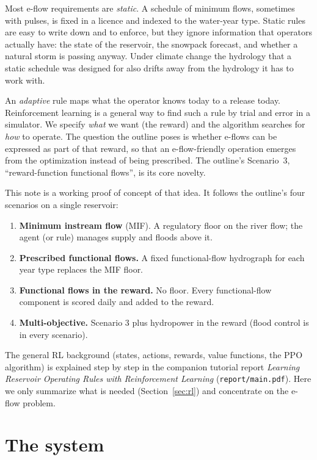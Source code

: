 \documentclass[11pt]{article}
\newcommand{\code}[1]{\texttt{#1}}
\begin{document}
Most e-flow requirements are \emph{static}. A schedule of minimum flows,
sometimes with pulses, is fixed in a licence and indexed to the water-year
type. Static rules are easy to write down and to enforce, but they ignore
information that operators actually have: the state of the reservoir, the
snowpack forecast, and whether a natural storm is passing anyway. Under
climate change the hydrology that a static schedule was designed for also
drifts away from the hydrology it has to work with.

An \emph{adaptive} rule maps what the operator knows today to a release
today. Reinforcement learning is a general way to find such a rule by
trial and error in a simulator. We specify \emph{what} we want (the reward)
and the algorithm searches for \emph{how} to operate. The question the
outline poses is whether e-flows can be expressed as part of that reward,
so that an e-flow-friendly operation emerges from the optimization instead
of being prescribed. The outline's Scenario~3, ``reward-function
functional flows'', is its core novelty.

This note is a working proof of concept of that idea. It follows the
outline's four scenarios on a single reservoir:

\begin{enumerate}
\item \textbf{Minimum instream flow} (MIF). A regulatory floor on the river
  flow; the agent (or rule) manages supply and floods above it.
\item \textbf{Prescribed functional flows.} A fixed functional-flow
  hydrograph for each year type replaces the MIF floor.
\item \textbf{Functional flows in the reward.} No floor. Every functional-flow
  component is scored daily and added to the reward.
\item \textbf{Multi-objective.} Scenario 3 plus hydropower in the reward
  (flood control is in every scenario).
\end{enumerate}

\noindent The general RL background (states, actions, rewards, value
functions, the PPO algorithm) is explained step by step in the companion
tutorial report \emph{Learning Reservoir Operating Rules with Reinforcement
Learning} (\code{report/main.pdf}). Here we only summarize what is needed
(Section~\ref{sec:rl}) and concentrate on the e-flow problem.

\section{The system}
\label{sec:system}
\end{document}
